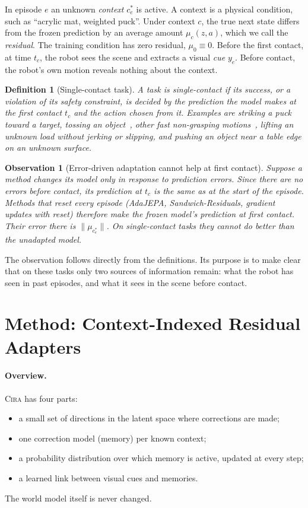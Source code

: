 \documentclass[10pt]{article}
\newtheorem{definition}{Definition}
\newtheorem{observation}{Observation}
\newcommand{\method}{\textsc{Cira}}
\begin{document}
In episode $e$ an unknown \emph{context} $c^\ast_e$ is active. A context is a physical condition, such
as ``acrylic mat, weighted puck''. Under context $c$, the true next state differs from the frozen
prediction by an average amount $\mu_c(z,a)$, which we call the \emph{residual}. The training
condition has zero residual, $\mu_0\equiv 0$. Before the first contact, at time $t_c$, the robot sees
the scene and extracts a visual \emph{cue} $y_e$. Before contact, the robot's own motion reveals
nothing about the context.

\begin{definition}[Single-contact task]
A task is \emph{single-contact} if its success, or a violation of its safety constraint, is decided by
the prediction the model makes at the first contact $t_c$ and the action chosen from it. Examples are
striking a puck toward a target, tossing an object~\cite{zeng2020tossingbot}, other fast
non-grasping motions~\cite{lynch1999dynamic}, lifting an unknown load without jerking or slipping, and
pushing an object near a table edge on an unknown surface.
\end{definition}

\begin{observation}[Error-driven adaptation cannot help at first contact]\label{obs:reactive}
Suppose a method changes its model only in response to prediction errors. Since there are no errors
before contact, its prediction at $t_c$ is the same as at the start of the episode. Methods that reset
every episode (AdaJEPA, Sandwich-Residuals, gradient updates with reset) therefore make the frozen
model's prediction at first contact. Their error there is $\|\mu_{c^\ast_e}\|$. On single-contact tasks
they cannot do better than the unadapted model.
\end{observation}

The observation follows directly from the definitions. Its purpose is to make clear that on these
tasks only two sources of information remain: what the robot has seen in past episodes, and what it
sees in the scene before contact.

\section{Method: Context-Indexed Residual Adapters}

\paragraph{Overview.}
\method{} has four parts:
\begin{itemize}
  \item a small set of directions in the latent space where corrections are made;
  \item one correction model (memory) per known context;
  \item a probability distribution over which memory is active, updated at every step;
  \item a learned link between visual cues and memories.
\end{itemize}
The world model itself is never changed.
\end{document}
